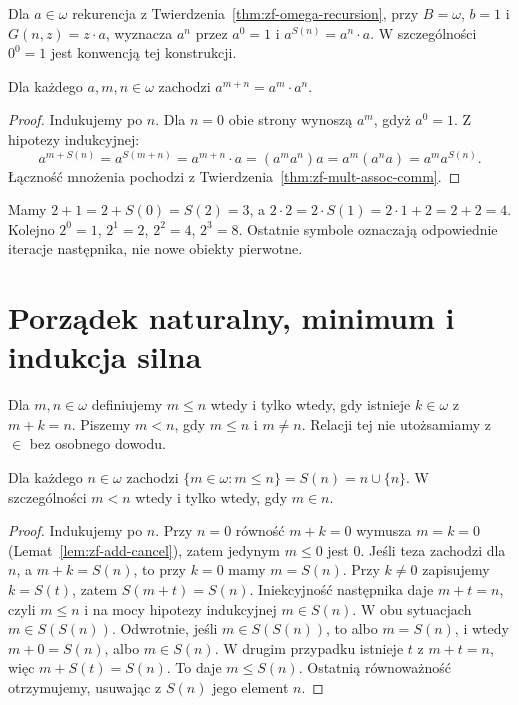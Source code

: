 \begin{definicja}[Potęgowanie]
\label{def:zf-exponentiation}
Dla $a\in\omega$ rekurencja z
Twierdzenia~\ref{thm:zf-omega-recursion},
przy $B=\omega$, $b=1$ i $G(n,z)=z\cdot a$,
wyznacza $a^n$ przez
$a^0=1$ i $a^{S(n)}=a^n\cdot a$.
W szczególności $0^0=1$ jest konwencją
tej konstrukcji.
\end{definicja}

\begin{twierdzenie}
\label{thm:zf-exponent-add}
Dla każdego $a,m,n\in\omega$
zachodzi $a^{m+n}=a^m\cdot a^n$.
\end{twierdzenie}
\begin{proof}
Indukujemy po $n$. Dla $n=0$
obie strony wynoszą $a^m$,
gdyż $a^0=1$.
Z hipotezy indukcyjnej:
\[
a^{m+S(n)}=a^{S(m+n)}=a^{m+n}\cdot a
=(a^m a^n)a=a^m(a^n a)=a^m a^{S(n)}.
\]
Łączność mnożenia pochodzi z
Twierdzenia~\ref{thm:zf-mult-assoc-comm}.
\end{proof}

\begin{przyklad}
\label{ex:zf-arithmetic}
Mamy $2+1=2+S(0)=S(2)=3$,
a $2\cdot2=2\cdot S(1)=2\cdot1+2=2+2=4$.
Kolejno $2^0=1$, $2^1=2$, $2^2=4$, $2^3=8$.
Ostatnie symbole oznaczają odpowiednie
iteracje następnika, nie nowe obiekty pierwotne.
\end{przyklad}

\section{Porządek naturalny, minimum i indukcja silna}

\begin{definicja}
\label{def:zf-natural-order}
Dla $m,n\in\omega$ definiujemy
$m\le n$ wtedy i tylko wtedy, gdy
istnieje $k\in\omega$ z $m+k=n$.
Piszemy $m<n$, gdy $m\le n$ i $m\ne n$.
Relacji tej nie utożsamiamy z $\in$
bez osobnego dowodu.
\end{definicja}

\begin{lemat}
\label{lem:zf-initial-segments}
Dla każdego $n\in\omega$ zachodzi
$\{m\in\omega:m\le n\}=S(n)=n\cup\{n\}$.
W szczególności $m<n$ wtedy i tylko wtedy,
gdy $m\in n$.
\end{lemat}
\begin{proof}
Indukujemy po $n$. Przy $n=0$ równość
$m+k=0$ wymusza $m=k=0$
(Lemat~\ref{lem:zf-add-cancel}),
zatem jedynym $m\le0$ jest $0$.
Jeśli teza zachodzi dla $n$,
a $m+k=S(n)$, to przy $k=0$
mamy $m=S(n)$. Przy $k\ne0$
zapisujemy $k=S(t)$, zatem
$S(m+t)=S(n)$. Iniekcyjność
następnika daje $m+t=n$,
czyli $m\le n$ i na mocy
hipotezy indukcyjnej $m\in S(n)$.
W obu sytuacjach $m\in S(S(n))$.
Odwrotnie, jeśli $m\in S(S(n))$,
to albo $m=S(n)$, i wtedy
$m+0=S(n)$, albo $m\in S(n)$.
W drugim przypadku istnieje $t$
z $m+t=n$, więc $m+S(t)=S(n)$.
To daje $m\le S(n)$.
Ostatnią równoważność otrzymujemy,
usuwając z $S(n)$ jego element $n$.
\end{proof}


